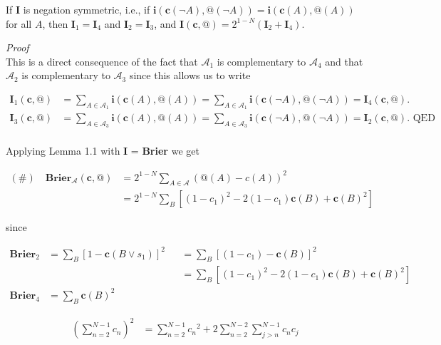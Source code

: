 \documentclass[
  10pt,
  letterpaper,
  DIV=11,
  numbers=noendperiod,
  twoside]{scrartcl}
\providecommand{\tightlist}{%
  \setlength{\itemsep}{0pt}\setlength{\parskip}{0pt}}\usepackage{longtable,booktabs,array}
\begin{document}
\begin{description}
\tightlist
\item[Lemma-1.1]
If \(\textbf{I}\) is negation symmetric, i.e., if
\(\mathbf{i}(\mathbf{c}(\neg A), @(\neg A)) = \mathbf{i}(\mathbf{c}(A), @(A))\)
for all \(A\), then \(\mathbf{I}_1 = \mathbf{I}_4\) and
\(\mathbf{I}_2 = \mathbf{I}_3\), and
\(\mathbf{I}(\mathbf{c},@) = 2^{1-N}(\mathbf{I}_2 + \mathbf{I}_4)\).
\end{description}

\emph{Proof}\\
This is a direct consequence of the fact that \(\mathscr{A}_1\) is
complementary to \(\mathscr{A}_4\) and that \(\mathscr{A}_2\) is
complementary to \(\mathscr{A}_3\) since this allows us to write

\[
\begin{aligned}
\mathbf{I}_1(\mathbf{c},@) &= \sum_{A \in \mathscr{A}_1} \mathbf{i}(\mathbf{c}(A), @(A)) = \sum_{A \in \mathscr{A}_1} \mathbf{i}(\mathbf{c}(\neg A), @(\neg A)) = \mathbf{I}_4(\mathbf{c},@). \\
\mathbf{I}_3(\mathbf{c},@) &= \sum_{A \in \mathscr{A}_3} \mathbf{i}(\mathbf{c}(A), @(A)) = \sum_{A \in \mathscr{A}_3} \mathbf{i}(\mathbf{c}(\neg A), @(\neg A)) = \mathbf{I}_2(\mathbf{c},@). \text{ QED}\\
\end{aligned}
\]

Applying Lemma 1.1 with \textbf{I} = \textbf{Brier} we get

\[
\begin{aligned}
(\#)\quad \mathbf{Brier}_{\mathscr{A}}(\mathbf{c}, @) &= 2^{1-N} \sum_{A \in \mathscr{A}} (@(A) - c(A))^2 \\
 &= 2^{1-N} \sum_B [(1-c_1)^2 - 2(1-c_1)\mathbf{c}(B) + \mathbf{c}(B)^2]
 \end{aligned}
\]

since

\[
\begin{aligned}
\mathbf{Brier}_2 &= \sum_B[1 - \mathbf{c}(B \vee s_1)]^2 &&= \sum_B[(1 - c_1) - \mathbf{c}(B)]^2 \\
& &&= \sum_B [(1-c_1)^2 - 2(1-c_1)\mathbf{c}(B) + \mathbf{c}(B)^2] \\
\mathbf{Brier}_4 &= \sum_B \mathbf{c}(B)^2 && \quad
\end{aligned}
\]

\begin{description}
\tightlist
\item[Lemma-1.2]
\[
 \begin{aligned}
 (\sum_{n=2}^{N-1} c_n)^2 &= \sum_{n=2}^{N-1} c{_n}^2 + 2 \sum_{n=2}^{N-2} \sum_{j>n}^{N-1}c_nc_j
 \end{aligned}
 \]
\end{description}
\end{document}
